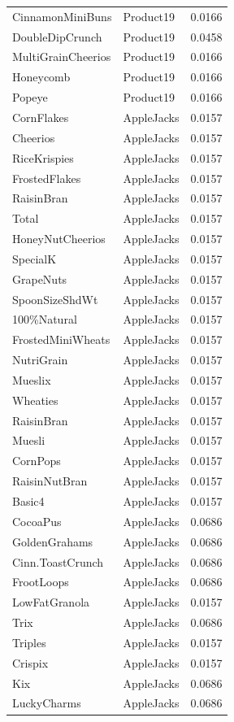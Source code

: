 \begin{longtable}{llr}
CinnamonMiniBuns & Product19 & 0.0166 \\
DoubleDipCrunch & Product19 & 0.0458 \\
MultiGrainCheerios & Product19 & 0.0166 \\
Honeycomb & Product19 & 0.0166 \\
Popeye & Product19 & 0.0166 \\
CornFlakes & AppleJacks & 0.0157 \\
Cheerios & AppleJacks & 0.0157 \\
RiceKrispies & AppleJacks & 0.0157 \\
FrostedFlakes & AppleJacks & 0.0157 \\
RaisinBran & AppleJacks & 0.0157 \\
Total & AppleJacks & 0.0157 \\
HoneyNutCheerios & AppleJacks & 0.0157 \\
SpecialK & AppleJacks & 0.0157 \\
GrapeNuts & AppleJacks & 0.0157 \\
SpoonSizeShdWt & AppleJacks & 0.0157 \\
100\%Natural & AppleJacks & 0.0157 \\
FrostedMiniWheats & AppleJacks & 0.0157 \\
NutriGrain & AppleJacks & 0.0157 \\
Mueslix & AppleJacks & 0.0157 \\
Wheaties & AppleJacks & 0.0157 \\
RaisinBran & AppleJacks & 0.0157 \\
Muesli & AppleJacks & 0.0157 \\
CornPops & AppleJacks & 0.0157 \\
RaisinNutBran & AppleJacks & 0.0157 \\
Basic4 & AppleJacks & 0.0157 \\
CocoaPus & AppleJacks & 0.0686 \\
GoldenGrahams & AppleJacks & 0.0686 \\
Cinn.ToastCrunch & AppleJacks & 0.0686 \\
FrootLoops & AppleJacks & 0.0686 \\
LowFatGranola & AppleJacks & 0.0157 \\
Trix & AppleJacks & 0.0686 \\
Triples & AppleJacks & 0.0157 \\
Crispix & AppleJacks & 0.0157 \\
Kix & AppleJacks & 0.0686 \\
LuckyCharms & AppleJacks & 0.0686 \\

\end{longtable}
